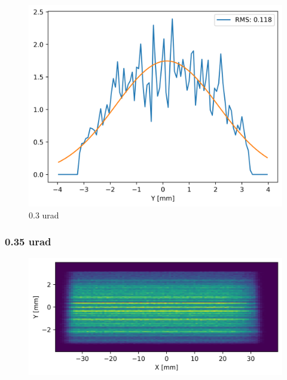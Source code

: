\begin{figure}[H]
\centering
\includegraphics[width=0.9\linewidth]{./../figures/slope_error/WB4C_d30_d-spacing_gradient_45keV_slope_error03urad_Yprofile.png}
\caption{0.3 urad}
\label{fig:03urad}
\end{figure}

\clearpage
\subsubsection{0.35 urad}
\begin{figure}[H]
\centering
\includegraphics[width=0.9\linewidth]{./../figures/slope_error/WB4C_d30_d-spacing_gradient_45keV_slope_error035urad.png}
\end{figure}

